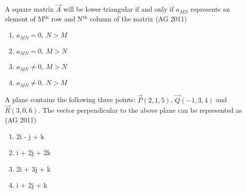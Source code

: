 \item A square matrix $\vec{A}$ will be lower triangular if and only if $a_{MN}$ represents an element of M$^{\text{th}}$ row and N$^{\text{th}}$ column of the matrix
\hfill{(AG 2011)}
\begin{multicols}{2}
\begin{enumerate}
\item $a_{MN} = 0, \ N > M$
\item $a_{MN} = 0, \ M > N$
\item $a_{MN} \neq 0, \ M > N$
\item $a_{MN} \neq 0, \ N > M$
\end{enumerate}
\end{multicols}
\item A plane contains the following three points: $\vec{P}(2,1,5)$, $\vec{Q}(-1,3,4)$ and $\vec{R}(3,0,6)$.  
The vector perpendicular to the above plane can be represented as
\hfill{(AG 2011)}
\begin{multicols}{4}
\begin{enumerate}
\item 2i - j + k
\item i + 2j + 2k
\item 2i + 3j + k
\item i + 2j + k
\end{enumerate}
\end{multicols}
